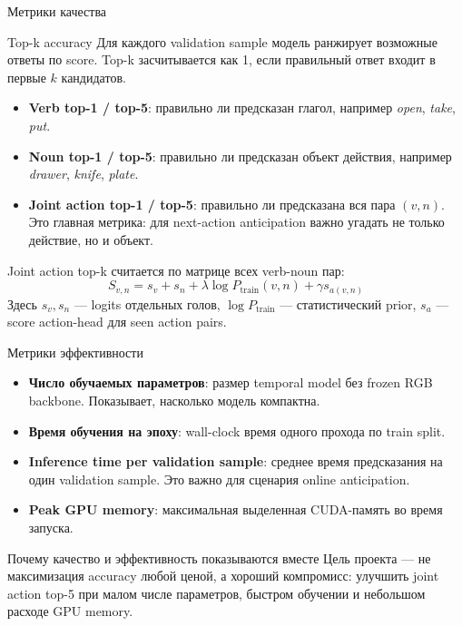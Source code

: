 \documentclass[aspectratio=169,10pt]{beamer}
\newcommand{\metric}[1]{\textbf{#1}}
\begin{document}
\begin{frame}{Метрики качества}
    \small
    \begin{block}{Top-k accuracy}
        Для каждого validation sample модель ранжирует возможные ответы по score.
        Top-k засчитывается как 1, если правильный ответ входит в первые \(k\) кандидатов.
    \end{block}

    \begin{itemize}
        \item \metric{Verb top-1 / top-5}: правильно ли предсказан глагол, например \textit{open}, \textit{take}, \textit{put}.
        \item \metric{Noun top-1 / top-5}: правильно ли предсказан объект действия, например \textit{drawer}, \textit{knife}, \textit{plate}.
        \item \metric{Joint action top-1 / top-5}: правильно ли предсказана вся пара \((v,n)\).
        Это главная метрика: для next-action anticipation важно угадать не только действие, но и объект.
    \end{itemize}

    \vspace{0.15cm}
    Joint action top-k считается по матрице всех verb-noun пар:
    \[
        S_{v,n} = s_v + s_n + \lambda \log P_{\text{train}}(v,n) + \gamma s_{a(v,n)}
    \]
    \footnotesize
    Здесь \(s_v, s_n\) --- logits отдельных голов, \(\log P_{\text{train}}\) --- статистический prior,
    \(s_a\) --- score action-head для seen action pairs.
\end{frame}

\begin{frame}{Метрики эффективности}
    \small
    \begin{itemize}
        \item \metric{Число обучаемых параметров}: размер temporal model без frozen RGB backbone.
        Показывает, насколько модель компактна.
        \item \metric{Время обучения на эпоху}: wall-clock время одного прохода по train split.
        \item \metric{Inference time per validation sample}: среднее время предсказания на один validation sample.
        Это важно для сценария online anticipation.
        \item \metric{Peak GPU memory}: максимальная выделенная CUDA-память во время запуска.
    \end{itemize}

    \vspace{0.25cm}
    \begin{block}{Почему качество и эффективность показываются вместе}
        Цель проекта --- не максимизация accuracy любой ценой, а хороший компромисс:
        улучшить joint action top-5 при малом числе параметров, быстром обучении и небольшом расходе GPU memory.
    \end{block}
\end{frame}
\end{document}
